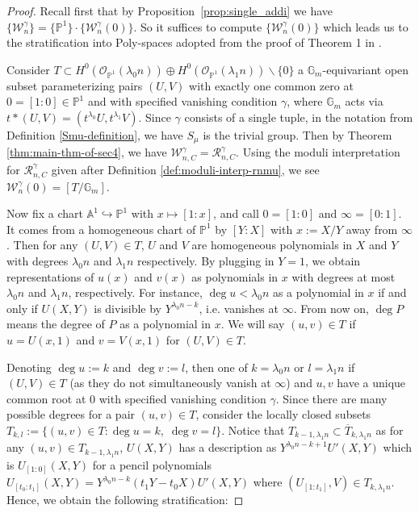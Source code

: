 \documentclass[a4paper,12pt]{amsart}
\theoremstyle{definition}
\newcommand{\bG}{\mathbb{G}}
\newcommand{\bP}{\mathbb{P}}
\newcommand{\cW}{\mathcal{W}}
\newcommand{\cR}{\mathcal{R}}
\newcommand{\Oc}{\mathcal{O}}
\newcommand{\Pb}{\mathbb{P}}
\newcommand{\A}{\mathbb{A}}
\newcommand{\Gb}{\mathbb{G}}
\renewcommand{\setminus}{\smallsetminus}
\begin{document}
	\begin{proof}
		Recall first that by Proposition~\ref{prop:single_addi} we have $\{\cW^\gamma_n\}=\{\Pb^1\} \cdot \{\cW_{n}^{\gamma}(0)\}$. So it suffices to compute $\{\cW_{n}^{\gamma}(0)\}$ which leads us to the stratification into Poly-spaces adopted from the proof of Theorem 1 in \cite[\S 4.1]{HP}.
		
		Consider $T \subset H^0(\Oc_{\Pb^1}(\lambda_0n))\oplus H^0(\Oc_{\Pb^1}(\lambda_1n))\setminus \{0\}$ a $\Gb_m$-equivariant open subset parameterizing pairs $(U,V)$ with exactly one common zero at $0 = [1:0] \in \bP^1$ and with specified vanishing condition $\gamma$, where $\Gb_m$ acts via $t*(U,V)=(t^{\lambda_0}U,t^{\lambda_1}V)$. Since $\gamma$ consists of a single tuple, in the notation from Definition \ref{Smu-definition}, we have $S_\mu$ is the trivial group. Then by Theorem \ref{thm:main-thm-of-sec4}, we have $\cW_{n,C}^\gamma=\cR_{n,C}^\gamma$. Using the moduli interpretation for $\cR_{n,C}^\gamma$ given after Definition \ref{def:moduli-interp-rnmu}, we see $\cW_n^\gamma(0)=[T/\bG_m]$.
		
		Now fix a chart $\A^1 \hookrightarrow \Pb^1$ with $x \mapsto [1:x]$, and call $0=[1:0]$ and $\infty=[0:1]$. It comes from a homogeneous chart of $\Pb^1$ by $[Y:X]$ with $x:=X/Y$ away from $\infty$. Then for any $(U,V) \in T$, $U$ and $V$ are homogeneous polynomials in $X$ and $Y$ with degrees $\lambda_0n$ and $\lambda_1n$ respectively. By plugging in $Y=1$, we obtain representations of $u(x)$ and $v(x)$ as polynomials in $x$ with degrees at most $\lambda_0n$ and $\lambda_1n$, respectively. For instance, $\deg u < \lambda_0n$ as a polynomial in $x$ if and only if $U(X,Y)$ is divisible by $Y^{\lambda_0n - k}$, i.e. vanishes at $\infty$. From now on, $\deg P$ means the degree of $P$ as a polynomial in $x$. We will say $(u,v) \in T$ if $u = U(x,1)$ and $v = V(x,1)$ for $(U,V) \in T$. 
		
		Denoting $\deg u:=k$ and $\deg v:=l$, then one of $k=\lambda_0n$ or $l=\lambda_1n$ if $(U,V) \in T$ (as they do not simultaneously vanish at $\infty$) and $u,v$ have a unique common root at $0$ with specified vanishing condition $\gamma$. Since there are many possible degrees for a pair $(u,v) \in T$, consider the locally closed subsets $T_{k,l}:=\{(u,v) \in T : \deg u=k, \; \deg v=l \}$. Notice that $T_{k-1,\lambda_1n} \subset \overline{T}_{k,\lambda_1n}$ as for any $(u,v) \in T_{k-1,\lambda_1n}$, $U(X,Y)$ has a description as $Y^{\lambda_0n-k+1}U'(X,Y)$ which is $U_{[1:0]}(X,Y)$ for a pencil polynomials $U_{[t_0:t_1]}(X,Y)=Y^{\lambda_0n-k}(t_1Y-t_0X)U'(X,Y)$ where $(U_{[1:t_1]},V) \in T_{k,\lambda_1n}$. Hence, we obtain the following stratification:
		

\end{proof}
\end{document}
